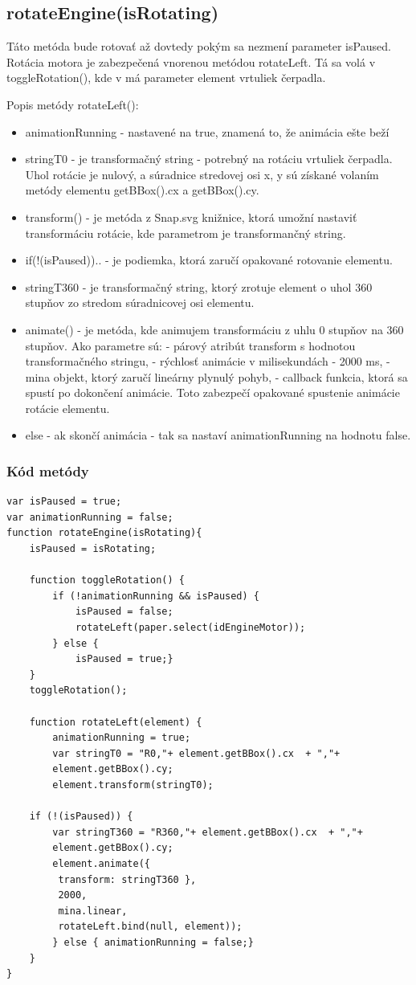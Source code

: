 \subsection{rotateEngine(isRotating)}
Táto metóda bude rotovať až dovtedy pokým sa nezmení parameter isPaused. Rotácia motora je zabezpečená vnorenou metódou rotateLeft. Tá sa volá v toggleRotation(), kde v má parameter element vrtuliek čerpadla. 

Popis metódy rotateLeft():
\begin{itemize}
\item animationRunning - nastavené na true, znamená to, že animácia ešte beží
\item stringT0 - je transformačný string - potrebný na rotáciu vrtuliek čerpadla. Uhol rotácie je nulový, a súradnice stredovej osi x, y sú získané volaním metódy elementu getBBox().cx a getBBox().cy. 
\item transform() - je metóda z Snap.svg knižnice, ktorá umožní nastaviť transformáciu rotácie, kde parametrom je transformančný string. 
\item if(!(isPaused)){..} - je podiemka, ktorá zaručí opakované rotovanie elementu. 
\item stringT360 - je transformačný string, ktorý zrotuje element o uhol 360 stupňov zo stredom súradnicovej osi elementu. 
\item animate() - je metóda, kde animujem transformáciu z uhlu 0 stupňov na 360 stupňov. Ako parametre sú:
\subitem - párový atribút transform s hodnotou transformačného stringu, 
\subitem - rýchlosť animácie v milisekundách - 2000 ms, 
\subitem - mina objekt, ktorý zaručí lineárny plynulý pohyb, 
\subitem - callback funkcia, ktorá sa spustí po dokončení animácie. Toto zabezpečí opakované spustenie animácie rotácie elementu. 
\item else - ak skončí animácia - tak sa nastaví animationRunning na hodnotu false. 
\end{itemize}

\subsubsection{Kód metódy} 
\begin{lstlisting}
var isPaused = true;
var animationRunning = false;
function rotateEngine(isRotating){
	isPaused = isRotating;

	function toggleRotation() {
		if (!animationRunning && isPaused) {
			isPaused = false;
			rotateLeft(paper.select(idEngineMotor));
		} else {
			isPaused = true;}
	}
	toggleRotation();

	function rotateLeft(element) {
		animationRunning = true;
		var stringT0 = "R0,"+ element.getBBox().cx 	+ ","+
		element.getBBox().cy;
		element.transform(stringT0);

	if (!(isPaused)) {
		var stringT360 = "R360,"+ element.getBBox().cx 	+ ","+
		element.getBBox().cy;
		element.animate({
		 transform: stringT360 },
		 2000, 
		 mina.linear, 
		 rotateLeft.bind(null, element));
		} else { animationRunning = false;}
	}
}
\end{lstlisting}


